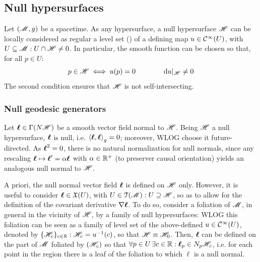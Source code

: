 \subsection{Null hypersurfaces}

Let $ (\mathscr{M} , g) $ be a spacetime. As any hypersurface, a null hypersurface $ \mathscr{H} $ can be locally considered as regular a level set () of a defining map $ u \in \mathcal{C}^{\infty}(U) $, with $ U \subseteq \mathscr{M} : U \cap \mathscr{H} \neq 0 $. In particular, the smooth function can be chosen so that, for all $ p \in U $:
\begin{equation*}
  p \in \mathscr{H} \iff u(p) = 0
  \qquad \qquad
  \mathrm{d} u \vert_\mathscr{H} \neq 0
\end{equation*}
The second condition ensures that $ \mathscr{H} $ is not self-intersecting.

\subsubsection{Null geodesic generators}

Let $ \boldsymbol{\ell} \in \Gamma(N \mathscr{H}) $ be a smooth vector field normal to $ \mathscr{H} $. Being $ \mathscr{H} $ a null hypersurface, $ \boldsymbol{\ell} $ is null, i.e. $ \braket{\boldsymbol{\ell} , \boldsymbol{\ell}}_g = 0 $; moreover, WLOG choose it future-directed. As $ \boldsymbol{\ell}^2 = 0 $, there is no natural normalization for null normals, since any rescaling $ \boldsymbol{\ell} \mapsto \boldsymbol{\ell}' = \alpha \boldsymbol{\ell} $ with $ \alpha \in \mathbb{R}^+ $ (to preserver causal orientation) yields an analogous null normal to $ \mathscr{H} $.

A priori, the null normal vector field $ \boldsymbol{\ell} $ is defined on $ \mathscr{H} $ only. However, it is useful to consider $ \boldsymbol{\ell} \in \mathfrak{X}(U) $, with $ U \in \EuScript{T}(\mathscr{M}) : U \supseteq \mathscr{H} $, so as to allow for the definition of the covariant derivative $ \nabla \boldsymbol{\ell} $. To do so, consider a foliation of $ \mathscr{M} $, in general in the vicinity of $ \mathscr{H} $, by a family of null hypersurfaces: WLOG this foliation can be seen as a family of level set of the above-defined $ u \in \mathcal{C}^{\infty}(U) $, denoted by $ \{\mathscr{H}_c\}_{c \in \mathbb{R}} : \mathscr{H}_c = u^{-1}(c) $, so that $ \mathscr{H} \equiv \mathscr{H}_0 $. Then, $ \boldsymbol{\ell} $ can be defined on the part of $ \mathscr{M} $ foliated by $ (\mathscr{H}_c) $ so that $ \forall p \in U \, \exists c \in \mathbb{R} : \boldsymbol{\ell}_p \in N_p\mathscr{H}_c $, i.e. for each point in the region there is a leaf of the foliation to which $ \ell $ is a null normal.

